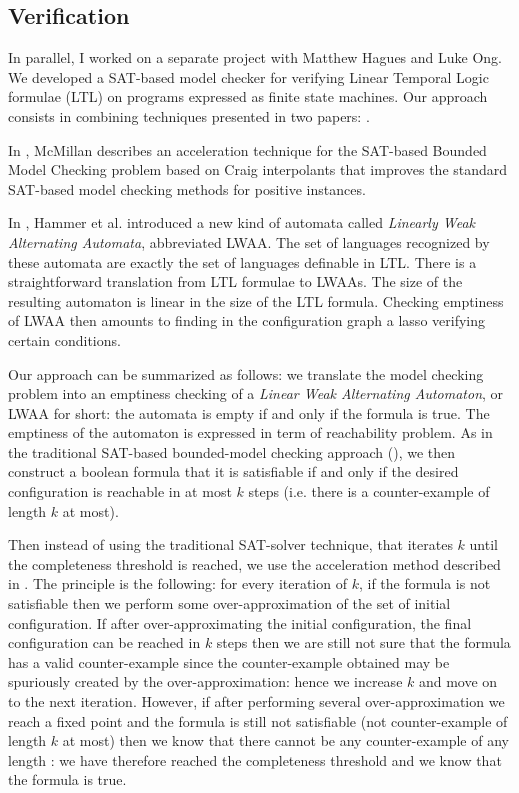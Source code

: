 \subsection{Verification}

In parallel, I worked on a separate project with Matthew Hagues and
Luke Ong. We developed a SAT-based  model checker for verifying
Linear Temporal Logic formulae (LTL) on programs expressed as finite
state machines. Our approach consists in combining techniques
presented in two papers: \cite{hammer:truly,
DBLP:conf/cav/McMillan03}.

In \cite{DBLP:conf/cav/McMillan03}, McMillan describes an
acceleration technique for the SAT-based Bounded Model Checking
problem based on Craig interpolants that improves the standard
SAT-based model checking methods for positive instances.

In \citep{hammer:truly}, Hammer et al. introduced a new kind of
automata called \emph{Linearly Weak Alternating Automata},
abbreviated LWAA. The set of languages recognized by these automata
are exactly the set of languages definable in LTL. There is a
straightforward translation from LTL formulae to LWAAs. The size of
the resulting automaton is linear in the size of the LTL formula.
Checking emptiness of LWAA then amounts to finding in the
configuration graph a lasso verifying certain conditions.

Our approach can be summarized as follows: we translate the model
checking problem into an emptiness checking of a \emph{Linear Weak
Alternating Automaton}, or LWAA for short: the automata is empty if
and only if the formula is true. The emptiness of the automaton is
expressed in term of reachability problem. As in the traditional
SAT-based bounded-model checking approach (\cite{biere99symbolic}),
we then construct a boolean formula that it is satisfiable if and
only if the desired configuration is reachable in at most $k$ steps
(i.e. there is a counter-example of length $k$ at most).

Then instead of using the traditional SAT-solver technique, that
iterates $k$ until the completeness threshold is reached, we use the
acceleration method described in \cite{DBLP:conf/cav/McMillan03}.
The principle is the following: for every iteration of $k$, if the
formula is not satisfiable then we perform some over-approximation
of the set of initial configuration. If after over-approximating the
initial configuration, the final configuration can be reached in $k$
steps then we are still not sure that the formula has a valid
counter-example since the counter-example obtained may be spuriously
created by the over-approximation: hence we increase $k$ and move on
to the next iteration. However, if after performing several
over-approximation we reach a fixed point and the formula is still
not satisfiable (not counter-example of length $k$ at most) then we
know that there cannot be any counter-example of any length : we
have therefore reached the completeness threshold and we know that
the formula is true.


